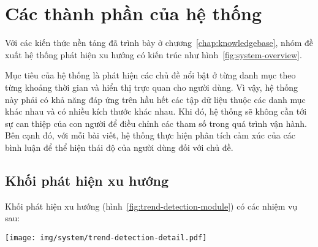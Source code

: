 \section{Các thành phần của hệ thống}

Với các kiến thức nền tảng đã trình bày ở chương~\ref{chap:knowledgebase}, nhóm đề xuất hệ thống phát hiện xu hướng có kiến trúc như hình~\ref{fig:system-overview}.


Mục tiêu của hệ thống là phát hiện các chủ đề nổi bật ở từng danh mục theo từng khoảng thời gian và hiển thị trực quan cho người dùng. Vì vậy, hệ thống này phải có khả năng đáp ứng trên hầu hết các tập dữ liệu thuộc các danh mục khác nhau và có nhiều kích thước khác nhau. Khi đó, hệ thống sẽ không cần tới sự can thiệp của con người để điều chỉnh các tham số trong quá trình vận hành. Bên cạnh đó, với mỗi bài viết, hệ thống thực hiện phân tích cảm xúc của các bình luận để thể hiện thái độ của người dùng đối với chủ đề.

\subsection{Khối phát hiện xu hướng}
Khối phát hiện xu hướng (hình~\ref{fig:trend-detection-module}) có các nhiệm vụ sau:

\begin{sidewaysfigure}
    \texttt{[image: img/system/trend-detection-detail.pdf]}
    \caption{Minh họa chi tiết khối phát hiện xu hướng.}
    \label{fig:trend-detection-module}
\end{sidewaysfigure}

